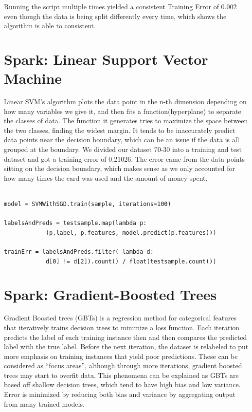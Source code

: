 \documentclass[9pt,twocolumn,twoside]{idsi}
\begin{document}
Running the script multiple times yielded a consistent Training Error of 0.002 even though the data is being split differently every time, which shows the algorithm is able to consistent.


\section{Spark: Linear Support Vector Machine}
Linear SVM’s algorithm plots the data point in the n-th dimension depending on how many variables we give it, and then fits a function(hyperplane) to separate the classes of data. The function it generates tries to maximize the space between the two classes, finding the widest margin. It tends to be inaccurately predict data points near the decision boundary, which can be an issue if the data is all grouped at the boundary. We divided our dataset 70-30 into a training and test dataset and got a training error of 0.21026. The error came from the data points sitting on the decision boundary, which makes sense as we only accounted for how many times the card was used and the amount of money spent. 

\begin{verbatim}

model = SVMWithSGD.train(sample, iterations=100)

labelsAndPreds = testsample.map(lambda p: 
			(p.label, p.features, model.predict(p.features)))
            
trainErr = labelsAndPreds.filter( lambda d: 
			d[0] != d[2]).count() / float(testsample.count())
\end{verbatim}


\section{Spark: Gradient-Boosted Trees}
Gradient Boosted trees (GBTs) is a regression method for categorical features that iteratively trains decision trees to minimize a loss function. Each iteration predicts the label of each training instance then and then compares the predicted label with the true label. Before the next iteration, the dataset is relabeled to put more emphasis on training instances that yield poor predictions. These can be considered as “focus areas”, although through more iterations, gradient boosted trees may start to overfit data. This phenomena can be explained as GBTs are based off shallow decision trees, which tend to have high bias and low variance. Error is minimized by reducing both bias and variance by aggregating output from many trained models. 
\end{document}
